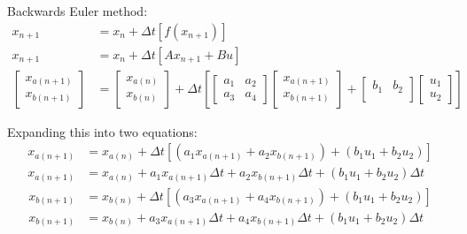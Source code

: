 \documentclass[11pt]{article}
\begin{document}
Backwards Euler method:
\begin{subequations}
  \begin{align}
    x_{n+1} &= x_n +\Delta t \left[f\left(x_{n+1}\right)\right] \\
    x_{n+1} &= x_n +\Delta t \left[Ax_{n+1}+Bu\right] \\
    \begin{bmatrix}
      x_{a(n+1)} \\
      x_{b(n+1)}
    \end{bmatrix} &=
    \begin{bmatrix}
      x_{a(n)} \\
      x_{b(n)}
    \end{bmatrix} +
    \Delta t \left[
    \begin{bmatrix}
      a_1 & a_2 \\
      a_3 & a_4
    \end{bmatrix}
    \begin{bmatrix}
      x_{a(n+1)} \\
      x_{b(n+1)}
    \end{bmatrix} +
    \begin{bmatrix}
      b_1 & b_2 \\
    \end{bmatrix}
    \begin{bmatrix}
      u_1 \\
      u_2
    \end{bmatrix}
    \right]
  \end{align}
\end{subequations}

Expanding this into two equations:
\begin{subequations}
  \begin{align}
    x_{a(n+1)} &= x_{a(n)} + \Delta t \left[\left(a_1 x_{a(n+1)} + a_2 x_{b(n+1)}\right) + (b_1 u_1 + b_2 u_2)\right] \\
    x_{a(n+1)} &= x_{a(n)} +  a_1 x_{a(n+1)}\Delta t + a_2 x_{b(n+1)}\Delta t + (b_1 u_1 + b_2 u_2)\Delta t
  \end{align}
\end{subequations}
\begin{subequations}
  \begin{align}
    x_{b(n+1)} &= x_{b(n)} + \Delta t \left[\left(a_3 x_{a(n+1)} + a_4 x_{b(n+1)}\right) + (b_1 u_1 + b_2 u_2)\right] \\
    x_{b(n+1)} &= x_{b(n)} +  a_3 x_{a(n+1)}\Delta t + a_4 x_{b(n+1)}\Delta t + (b_1 u_1 + b_2 u_2)\Delta t
  \end{align}
\end{subequations}
\end{document}
